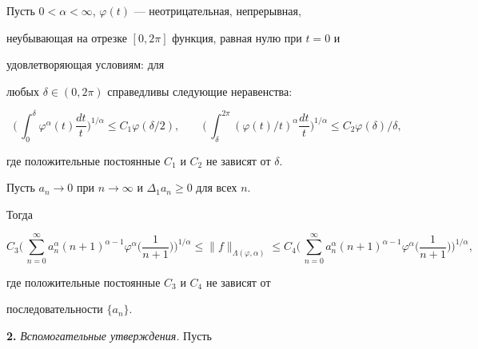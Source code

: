 \begin{note}


Пусть $0<\alpha<\infty$, $\varphi(t)$ --- неотрицательная, непрерывная,


неубывающая на отрезке $[0,2\pi]$ функция, равная нулю при $t=0$ и


удовлетворяющая условиям: для


любых $\delta\in(0,2\pi)$ справедливы следующие неравенства:


$$


\biggl(\,\int^\delta_0\varphi^\alpha(t)\frac{dt}{t} \biggr)^{1/\alpha}


\le C_1\varphi(\delta/2),\qquad


\biggl(\,\int^{2\pi}_\delta(\varphi(t)/t)^\alpha\frac{dt}{t}


\biggr)^{1/\alpha}\le C_2\varphi(\delta)/\delta,


$$


где положительные постоянные $C_1$ и $C_2$ не зависят от $\delta$.


\end{note}





Пусть $a_n\to 0$ при $n\to \infty$ и $\Delta_1a_n\ge 0$ для всех $n$.


Тогда


$$


C_3\biggl(\,\sum^\infty_{n=0}a^\alpha_n(n+1)^{\alpha-1}\varphi^\alpha


\biggl(\frac{1}{n+1} \biggr)\biggr)^{1/\alpha}\le


\|f\|_{\Lambda(\varphi,\alpha)}\le C_4\biggl(\,


\sum^\infty_{n=0}a^\alpha_n(n+1)^{\alpha-1}\varphi^\alpha


\biggl(\frac{1}{n+1} \biggr)\biggr)^{1/\alpha},


$$


где положительные постоянные $C_3$ и $C_4$ не зависят от


последовательности $\{a_n\}$.


\medskip





{\bf 2.} {\it Вспомогательные утверждения.} Пусть


